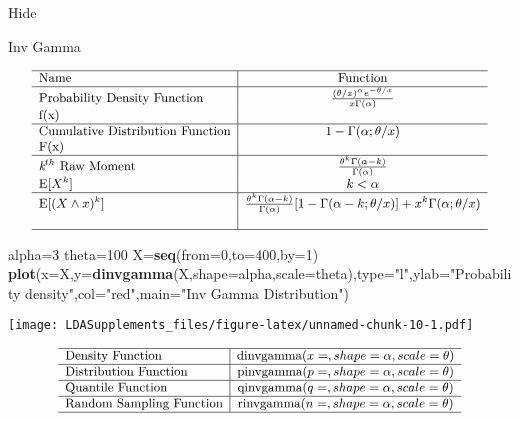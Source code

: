 \documentclass[]{book}
\newenvironment{Shaded}{\begin{snugshade}}{\end{snugshade}}
\newcommand{\KeywordTok}[1]{\textcolor[rgb]{0.13,0.29,0.53}{\textbf{#1}}}
\newcommand{\DataTypeTok}[1]{\textcolor[rgb]{0.13,0.29,0.53}{#1}}
\newcommand{\DecValTok}[1]{\textcolor[rgb]{0.00,0.00,0.81}{#1}}
\newcommand{\StringTok}[1]{\textcolor[rgb]{0.31,0.60,0.02}{#1}}
\newcommand{\NormalTok}[1]{#1}
\begin{document}
\hypertarget{2pF}{}
{Hide}

Inv Gamma

\[
{\small
\begin{matrix}
\begin{array}{l|c}
\hline
  \text{Name} & \text{Function} \\
\hline
  \text{Probability Density Function} & \frac{(\theta/x)^\alpha e^{-\theta/x}}{x\Gamma(\alpha)} \\
    \text{f(x)} & \\
\hline
  \text{Cumulative Distribution Function} & 1-\Gamma(\alpha;\theta/x) \\
    \text{F(x)} & \\
\hline
  \textit{k}^{th}~\text{Raw Moment} & \frac{\theta^k\Gamma(\alpha-k)}{\Gamma(\alpha)} \\
  \mathrm{E}[X^k]  & k<\alpha \\
\hline
  \mathrm{E}[(X\wedge x)^k] & \frac{\theta^k\Gamma(\alpha-k)}{\Gamma(\alpha)}[1-\Gamma(\alpha-k;\theta/x)]+x^k\Gamma(\alpha;\theta/x) \\
  &  \\
\hline
\end{array}
\end{matrix}
}
\]

\begin{Shaded}
\begin{Highlighting}[]
\NormalTok{alpha=}\DecValTok{3}
\NormalTok{theta=}\DecValTok{100}
\NormalTok{X=}\KeywordTok{seq}\NormalTok{(}\DataTypeTok{from=}\DecValTok{0}\NormalTok{,}\DataTypeTok{to=}\DecValTok{400}\NormalTok{,}\DataTypeTok{by=}\DecValTok{1}\NormalTok{)}
\KeywordTok{plot}\NormalTok{(}\DataTypeTok{x=}\NormalTok{X,}\DataTypeTok{y=}\KeywordTok{dinvgamma}\NormalTok{(X,}\DataTypeTok{shape=}\NormalTok{alpha,}\DataTypeTok{scale=}\NormalTok{theta),}\DataTypeTok{type=}\StringTok{"l"}\NormalTok{,}\DataTypeTok{ylab=}\StringTok{"Probability density"}\NormalTok{,}\DataTypeTok{col=}\StringTok{"red"}\NormalTok{,}\DataTypeTok{main=}\StringTok{"Inv Gamma Distribution"}\NormalTok{)}
\end{Highlighting}
\end{Shaded}

\texttt{[image: LDASupplements\_files/figure-latex/unnamed-chunk-10-1.pdf]}

\[
{\small
\begin{matrix}
\begin{array}{l|c}
\hline
  \text{Density Function} & \text{dinvgamma}(x=, shape=\alpha, scale=\theta) \\
\hline
  \text{Distribution Function} & \text{pinvgamma}(p=, shape=\alpha,scale=\theta) \\
\hline
  \text{Quantile Function} & \text{qinvgamma}(q=, shape=\alpha,scale=\theta) \\ 
\hline
  \text{Random Sampling Function} & \text{rinvgamma}(n=, shape=\alpha,scale=\theta) \\
\hline
\end{array}
\end{matrix}
}
\]
\end{document}

